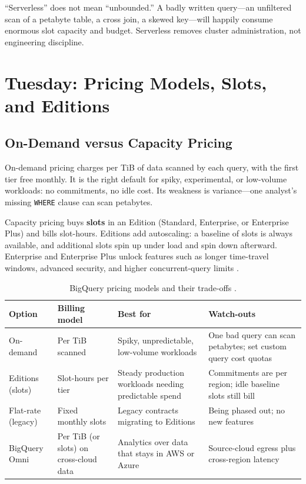 \begin{pitfall}
``Serverless'' does not mean ``unbounded.'' A badly written query---an unfiltered scan of a petabyte table, a cross join, a skewed key---will happily consume enormous slot capacity and budget. Serverless removes cluster administration, not engineering discipline.
\end{pitfall}

\section{Tuesday: Pricing Models, Slots, and Editions}

\subsection{On-Demand versus Capacity Pricing}
On-demand pricing charges per TiB of data scanned by each query, with the first tier free monthly. It is the right default for spiky, experimental, or low-volume workloads: no commitments, no idle cost. Its weakness is variance---one analyst's missing \texttt{WHERE} clause can scan petabytes.

Capacity pricing buys \textbf{slots} in an Edition (Standard, Enterprise, or Enterprise Plus) and bills slot-hours. Editions add autoscaling: a baseline of slots is always available, and additional slots spin up under load and spin down afterward. Enterprise and Enterprise Plus unlock features such as longer time-travel windows, advanced security, and higher concurrent-query limits \cite{googlecloudbigquerypricing}.

\begin{table}[H]
\centering
\small
\begin{tabular}{@{}p{2.6cm}p{3.2cm}p{3.8cm}p{4.0cm}@{}} \\
\toprule
\textbf{Option} & \textbf{Billing model} & \textbf{Best for} & \textbf{Watch-outs} \\
\midrule
On-demand & Per TiB scanned & Spiky, unpredictable, low-volume workloads & One bad query can scan petabytes; set custom query cost quotas \\
Editions (slots) & Slot-hours per tier & Steady production workloads needing predictable spend & Commitments are per region; idle baseline slots still bill \\
Flat-rate (legacy) & Fixed monthly slots & Legacy contracts migrating to Editions & Being phased out; no new features \\
BigQuery Omni & Per TiB (or slots) on cross-cloud data & Analytics over data that stays in AWS or Azure & Source-cloud egress plus cross-region latency \\
\bottomrule
\end{tabular}
\caption{BigQuery pricing models and their trade-offs \cite{googlecloudbigquerypricing}.}
\label{tab:ch5-pricing-models}
\end{table}

